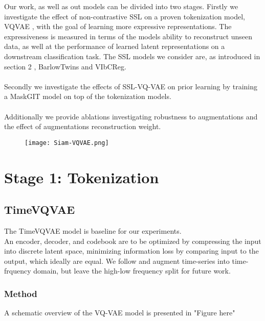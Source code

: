 \documentclass[../../thesis.tex]{subfiles}
\begin{document}
Our work, as well as out models can be divided into two stages. Firstly we investigate the effect of non-contrastive SSL on a proven tokenization model, VQVAE \cite{VQVAE}, with the goal of learning more expressive representations. The expressiveness is measured in terms of the models ability to reconstruct unseen data, as well at the performance of learned latent representations on a downstream classification task. The SSL models we consider are, as introduced in section 2 , BarlowTwins and VIbCReg.\\\\

Secondly we investigate the effects of SSL-VQ-VAE on prior learning by training a MaskGIT model on top of the tokenization models.\\\\

Additionally we provide ablations investigating robustness to augmentations and the effect of augmentations reconstruction weight. \newline




\begin{figure}[h]
    \texttt{[image: Siam-VQVAE.png]}
    \centering    
\end{figure}


\section{Stage 1: Tokenization}


\subsection{TimeVQVAE}
The TimeVQVAE model is baseline for our experiments.\\

An encoder, decoder, and codebook are to be optimized by compressing the input into discrete latent space, minimizing information loss by comparing input to the output, which ideally are equal. We follow \cite{TimeVQVAE} and augment time-series into time-frquency domain, but leave the high-low frequency split for future work.

\subsubsection{Method}
A schematic overview of the VQ-VAE model is presented in "Figure here"
\end{document}
